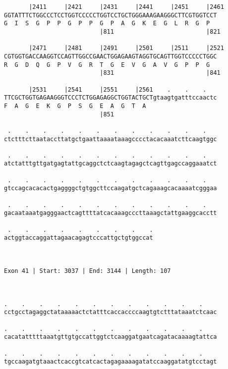 \documentclass{article}
\begin{document}
\begin{Verbatim}
       |2411     |2421     |2431     |2441     |2451     |2461
GGTATTTCTGGCCCTCCTGGTCCCCCTGGTCCTGCTGGGAAAGAAGGGCTTCGTGGTCCT
G  I  S  G  P  P  G  P  P  G  P  A  G  K  E  G  L  R  G  P  
                           |811                          |821
  
       |2471     |2481     |2491     |2501     |2511     |2521
CGTGGTGACCAAGGTCCAGTTGGCCGAACTGGAGAAGTAGGTGCAGTTGGTCCCCCTGGC
R  G  D  Q  G  P  V  G  R  T  G  E  V  G  A  V  G  P  P  G  
                           |831                          |841
  
       |2531     |2541     |2551     |2561    .    .    .   
TTCGCTGGTGAGAAGGGTCCCTCTGGAGAGGCTGGTACTGCTgtaagtgatttccaactc
F  A  G  E  K  G  P  S  G  E  A  G  T  A                    
                           |851                             
  
 .    .    .    .    .    .    .    .    .    .    .    .   
ctctttcttaataccttatgctgaattaaaataaagcccctacacaaatcttcaagtggc
                                                            
 .    .    .    .    .    .    .    .    .    .    .    .   
atctatttgttgatgagtattgcaggctctcaagtagagctcagttgagccaggaaatct
                                                            
 .    .    .    .    .    .    .    .    .    .    .    .   
gtccagcacacactgaggggctgtggcttccaagatgctcagaaagcacaaaatcgggaa
                                                            
 .    .    .    .    .    .    .    .    .    .    .    .   
gacaataaatgagggaactcagttttatcacaaagcccttaaagctattgaaggcacctt
                                                            
 .    .    .    .    .    .    .    .    .
actggtaccaggattagaacagagtcccattgctgtggccat
                                          
                                          
 
Exon 41 | Start: 3037 | End: 3144 | Length: 107



.    .    .    .    .    .    .    .    .    .    .    .    
cctgcctagaggctataaaaactctatttcaccaccccaagtgtctttataaatctcaac
                                                            
.    .    .    .    .    .    .    .    .    .    .    .    
cacatatttttaaatgttgtgccattggtctcaaggatgaatcagatacaaaagtattca
                                                            
.    .    .    .    .    .    .    .    .    .    .    .    
tgccaagatgtaaactcaccgtcatcactagagaaaagatatccaaggatatgtcctagt
                                                            

\end{Verbatim}
\end{document}
